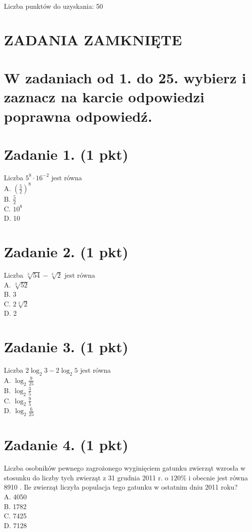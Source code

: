 \documentclass[10pt]{article}
\begin{document}
Liczba punktów do uzyskania: 50

\section*{ZADANIA ZAMKNIĘTE}
\section*{W zadaniach od 1. do 25. wybierz i zaznacz na karcie odpowiedzi poprawna odpowiedź.}
\section*{Zadanie 1. (1 pkt)}
Liczba \(5^{8} \cdot 16^{-2}\) jest równa\\
A. \(\left(\frac{5}{2}\right)^{8}\)\\
B. \(\frac{5}{2}\)\\
C. \(10^{8}\)\\
D. 10

\section*{Zadanie 2. (1 pkt)}
Liczba \(\sqrt[3]{54}-\sqrt[3]{2}\) jest równa\\
A. \(\sqrt[3]{52}\)\\
B. 3\\
C. \(2 \sqrt[3]{2}\)\\
D. 2

\section*{Zadanie 3. (1 pkt)}
Liczba \(2 \log _{2} 3-2 \log _{2} 5\) jest równa\\
A. \(\log _{2} \frac{9}{25}\)\\
B. \(\log _{2} \frac{3}{5}\)\\
C. \(\log _{2} \frac{9}{5}\)\\
D. \(\log _{2} \frac{6}{25}\)

\section*{Zadanie 4. (1 pkt)}
Liczba osobników pewnego zagrożonego wyginięciem gatunku zwierząt wzrosła w stosunku do liczby tych zwierząt z 31 grudnia 2011 r. o \(120 \%\) i obecnie jest równa 8910 . Ile zwierząt liczyła populacja tego gatunku w ostatnim dniu 2011 roku?\\
A. 4050\\
B. 1782\\
C. 7425\\
D. 7128
\end{document}

